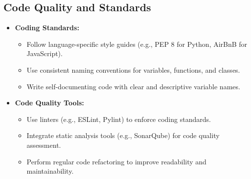 \subsection{Code Quality and Standards}
\begin{itemize}[leftmargin=*]
    \item \textbf{Coding Standards:}
    \begin{itemize}
        \item Follow language-specific style guides (e.g., PEP 8 for Python, AirBnB for JavaScript).
        \item Use consistent naming conventions for variables, functions, and classes.
        \item Write self-documenting code with clear and descriptive variable names.
    \end{itemize}
    
    \item \textbf{Code Quality Tools:}
    \begin{itemize}
        \item Use linters (e.g., ESLint, Pylint) to enforce coding standards.
        \item Integrate static analysis tools (e.g., SonarQube) for code quality assessment.
        \item Perform regular code refactoring to improve readability and maintainability.
    \end{itemize}
\end{itemize}

